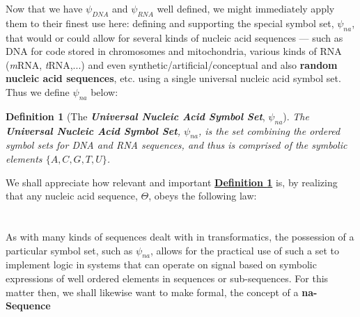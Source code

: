 \documentclass[a4paper, 18pt]{book} %
\newtheorem{defn}{Definition}
\newtheorem{law}{Law}
\begin{document}
\vspace{2em}


Now that we have $\psi_{DNA}$ and $\psi_{RNA}$ well defined, we might immediately apply them to their finest use here: defining and supporting the special symbol set, $\psi_{na}$, that would or could allow for several kinds of nucleic acid sequences --- such as DNA for code stored in chromosomes and mitochondria, various kinds of RNA (\textit{m}RNA, \textit{t}RNA,...) and even synthetic/artificial/conceptual and also \textbf{random nucleic acid sequences}, etc. using a single universal nucleic acid symbol set. Thus we define $\psi_{na}$ below:

\vspace{2em}


\begin{defn}[The \textit{\textbf{Universal Nucleic Acid Symbol Set}}, $\psi_{na}$]
\label{DEFUNA}
The \textbf{Universal Nucleic Acid Symbol Set}, $\psi_{na}$, is the set combining the ordered symbol sets for DNA and RNA sequences, and thus is comprised of the symbolic elements $\{A, C, G, T, U \}$.
\end{defn}


We shall appreciate how relevant and important \textbf{\hyperref[DEFUNA]{Definition \ref{DEFUNA}}} is, by realizing that any nucleic acid sequence, $\Theta$, obeys the following law:\\


\\\\


As with many kinds of sequences dealt with in transformatics, the possession of a particular symbol set, such as $\psi_{na}$, allows for the practical use of such a set to implement logic in systems that can operate on signal based on symbolic expressions of well ordered elements in sequences or sub-sequences. For this matter then, we shall likewise want to make formal, the concept of a \textbf{na-Sequence}
\end{document}
